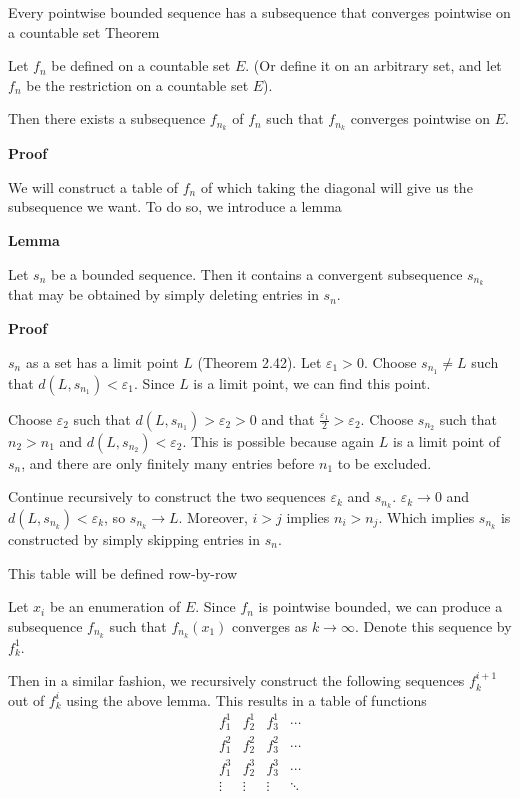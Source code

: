 \begin{result}
    {Every pointwise bounded sequence has a subsequence that converges pointwise on a countable set}
    {Theorem}

    Let $f_n$ be defined on a countable set $E$. (Or define it on an arbitrary set, and let $f_n$ be the restriction on a countable set $E$).

    Then there exists a subsequence $f_{n_k}$ of $f_n$ such that $f_{n_k}$ converges pointwise on $E$.

    \textbf{Proof}

    We will construct a table of $f_n$ of which taking the diagonal will give us the subsequence we want. To do so, we introduce a lemma

    \begin{myboxed}
    \textbf{Lemma}

    Let $s_n$ be a bounded sequence. Then it contains a convergent subsequence $s_{n_k}$ that may be obtained by simply deleting entries in $s_n$.

    \textbf{Proof}

    $s_n$ as a set has a limit point $L$ (Theorem 2.42). Let $\varepsilon_1 > 0$. Choose $s_{n_1} \neq L$ such that $d(L, s_{n_1}) < \varepsilon_1$. Since $L$ is a limit point, we can find this point. 

    Choose $\varepsilon_2$ such that $d(L, s_{n_1}) > \varepsilon_2 > 0$ and that $\frac{\varepsilon_1}{2} > \varepsilon_2$. Choose $s_{n_2}$ such that $n_2 > n_1$ and $d(L, s_{n_2}) < \varepsilon_2$. This is possible because again $L$ is a limit point of $s_n$, and there are only finitely many entries before $n_1$ to be excluded. 

    Continue recursively to construct the two sequences $\varepsilon_k$ and $s_{n_k}$. $\varepsilon_k \to 0$ and $d(L, s_{n_k}) < \varepsilon_k$, so $s_{n_k} \to L$. Moreover, $i > j$ implies $n_i > n_j$. Which implies $s_{n_k}$ is constructed by simply skipping entries in $s_n$.
    \end{myboxed}

    This table will be defined row-by-row

    Let $x_i$ be an enumeration of $E$. Since $f_n$ is pointwise bounded, we can produce a subsequence $f_{n_k}$ such that $f_{n_k}(x_1)$ converges as $k \to \infty$. Denote this sequence by $f^1_k$. 

    Then in a similar fashion, we recursively construct the following sequences $f^{i+1}_k$ out of $f^i_k$ using the above lemma. This results in a table of functions
    \[\begin{matrix}
        f^1_1 & f^1_2 & f^1_3 & \cdots \\
        f^2_1 & f^2_2 & f^2_3 & \cdots \\
        f^3_1 & f^3_2 & f^3_3 & \cdots \\
        \vdots & \vdots & \vdots & \ddots
    \end{matrix}\]


\end{result}

